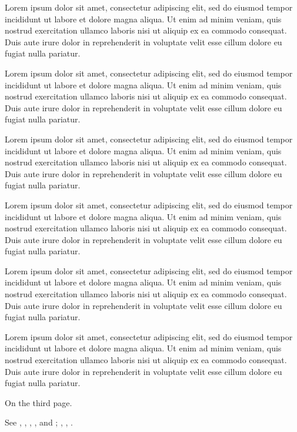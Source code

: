 \documentclass{article}
\begin{document}
Lorem ipsum dolor sit amet, consectetur adipiscing elit, sed do eiusmod tempor incididunt ut labore et dolore magna aliqua. Ut enim ad minim veniam, quis nostrud exercitation ullamco laboris nisi ut aliquip ex ea commodo consequat. Duis aute irure dolor in reprehenderit in voluptate velit esse cillum dolore eu fugiat nulla pariatur.

Lorem ipsum dolor sit amet, consectetur adipiscing elit, sed do eiusmod tempor incididunt ut labore et dolore magna aliqua. Ut enim ad minim veniam, quis nostrud exercitation ullamco laboris nisi ut aliquip ex ea commodo consequat. Duis aute irure dolor in reprehenderit in voluptate velit esse cillum dolore eu fugiat nulla pariatur.

Lorem ipsum dolor sit amet, consectetur adipiscing elit, sed do eiusmod tempor incididunt ut labore et dolore magna aliqua. Ut enim ad minim veniam, quis nostrud exercitation ullamco laboris nisi ut aliquip ex ea commodo consequat. Duis aute irure dolor in reprehenderit in voluptate velit esse cillum dolore eu fugiat nulla pariatur.

Lorem ipsum dolor sit amet, consectetur adipiscing elit, sed do eiusmod tempor incididunt ut labore et dolore magna aliqua. Ut enim ad minim veniam, quis nostrud exercitation ullamco laboris nisi ut aliquip ex ea commodo consequat. Duis aute irure dolor in reprehenderit in voluptate velit esse cillum dolore eu fugiat nulla pariatur.

Lorem ipsum dolor sit amet, consectetur adipiscing elit, sed do eiusmod tempor incididunt ut labore et dolore magna aliqua. Ut enim ad minim veniam, quis nostrud exercitation ullamco laboris nisi ut aliquip ex ea commodo consequat. Duis aute irure dolor in reprehenderit in voluptate velit esse cillum dolore eu fugiat nulla pariatur.

Lorem ipsum dolor sit amet, consectetur adipiscing elit, sed do eiusmod tempor incididunt ut labore et dolore magna aliqua. Ut enim ad minim veniam, quis nostrud exercitation ullamco laboris nisi ut aliquip ex ea commodo consequat. Duis aute irure dolor in reprehenderit in voluptate velit esse cillum dolore eu fugiat nulla pariatur.

On the third page.\label{p3}

See , , , ,  and ; , , .
\end{document}

